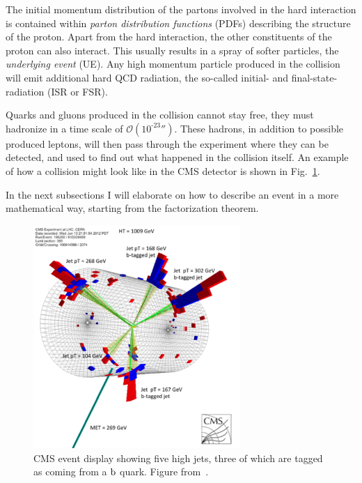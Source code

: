 The initial momentum distribution of the partons involved in the hard interaction is contained
within \textit{parton distribution functions} (PDFs) describing the structure of the proton. 
Apart from the hard interaction, the other constituents of the proton can also interact. This
usually results in a spray of softer particles, the \textit{underlying event} (UE). 
Any high momentum particle produced in the collision will emit additional hard QCD radiation, the
so-called initial- and final-state-radiation (ISR or FSR).

Quarks and gluons produced in the collision cannot stay free, they must hadronize in a time scale
of $\mathcal{O}(\text{10}^{\text{-23}}\second)$. These hadrons, in addition to possible produced
leptons, will then pass through the experiment where they can be detected, and used to find out
what happened in the collision itself. An example of how a collision might look like in the CMS
detector is shown in Fig.~\ref{fig:event_display}. 

In the next subsections I will elaborate on how to describe an event in a more mathematical way,
starting from the factorization theorem.

\begin{figure}[htpb]
  \centering
  \includegraphics[width=0.7\textwidth]{figures/eventreco_event/event_display_SUS12024}
  \caption{CMS event display showing five high \pt jets, three of which are tagged as coming from a
$\mathrm{b}$ quark. Figure from~\cite{SUS12024_event_display}.
  \label{fig:event_display}}
\end{figure}


